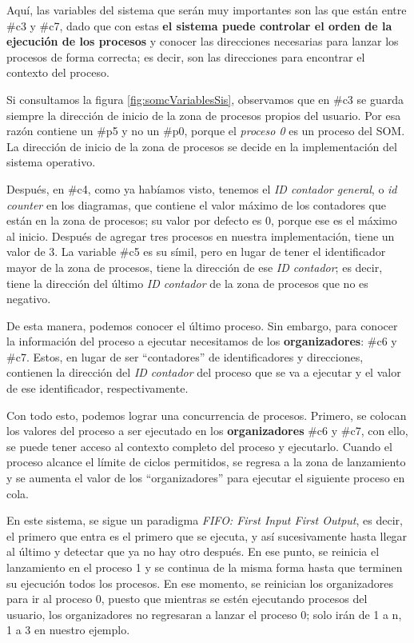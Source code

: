 \documentclass[letterpaper,12pt,oneside]{book}
\begin{document}
		Aquí,
		las variables del sistema que serán muy importantes son las que están entre \#c3 y \#c7, dado que con estas 
		\textbf{el sistema puede controlar el orden de la ejecución
		de los procesos}		
		 y conocer las direcciones necesarias para lanzar los procesos de forma correcta; es decir, son las direcciones para encontrar
		el contexto del proceso. 
  
        Si consultamos la figura \ref{fig:somcVariablesSis}, observamos que en \#c3 se guarda siempre la dirección de inicio de la
		zona de procesos propios del usuario. Por esa razón contiene un \#p5 y no un \#p0, porque el \textit{proceso 0} es un proceso del SOM. La 
		dirección de inicio de la zona de procesos se decide en la implementación del sistema operativo.
  
        Después, en \#c4, como ya habíamos visto, tenemos el \textit{ID contador general}, o \textit{id counter} en los diagramas, que
		contiene el valor máximo de los contadores que están en la zona de procesos; su valor por defecto es 0, porque ese es el máximo al inicio. 
		Después de agregar tres procesos 
		en nuestra implementación, tiene un valor de 3. La variable \#c5 es su símil, pero en lugar de tener el identificador mayor
		de la zona de procesos, tiene la dirección de ese \textit{ID contador}; 
		es decir, tiene la dirección del último \textit{ID contador} de la zona de procesos
		que no es negativo.
  
        De esta manera, podemos conocer el último proceso. Sin embargo, para conocer la información del proceso a ejecutar necesitamos de los 
        \textbf{organizadores}: \#c6 y \#c7. Estos, en lugar de ser ``contadores''
		de identificadores y direcciones, contienen la dirección del \textit{ID contador} del proceso que se va a ejecutar y el valor de ese 
		identificador, respectivamente.
		
		
		Con todo esto, podemos lograr una concurrencia de procesos. Primero, se colocan los valores 
		del proceso a ser ejecutado en los
		\textbf{organizadores} \#c6 y \#c7, con ello, se puede tener acceso al contexto completo del proceso y ejecutarlo. Cuando
		el proceso alcance el límite de ciclos permitidos, se regresa 
		a la zona de lanzamiento
		y se aumenta el valor de los ``organizadores'' para ejecutar el siguiente proceso en cola. 
		
		En
		este sistema, se sigue un paradigma \textit{FIFO: First Input First 
		Output}, 
		es decir, el primero que entra es el primero que se ejecuta, 
		y así sucesivamente hasta llegar al último y detectar que ya no hay otro después. En 
		ese punto, se reinicia el lanzamiento en el proceso 1 y se continua de la misma forma hasta que terminen su ejecución todos los procesos.
		En ese momento, se reinician los organizadores para ir al proceso 0, puesto que mientras se estén ejecutando procesos del usuario, los organizadores
		no regresaran a lanzar el proceso 0; solo irán de 1 a n, 1 a 3 en nuestro ejemplo. 
		
\end{document}
